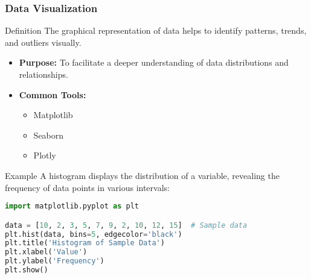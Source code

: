 \documentclass[aspectratio=169]{beamer}
\begin{document}
\begin{frame}[fragile]
  \frametitle{Data Visualization}
  \begin{block}{Definition}
    The graphical representation of data helps to identify patterns, trends, and outliers visually.
  \end{block}
  \begin{itemize}
    \item \textbf{Purpose:} To facilitate a deeper understanding of data distributions and relationships.
    \item \textbf{Common Tools:}
      \begin{itemize}
        \item Matplotlib
        \item Seaborn
        \item Plotly
      \end{itemize}
  \end{itemize}
  \begin{block}{Example}
    A histogram displays the distribution of a variable, revealing the frequency of data points in various intervals:
  \end{block}
  \begin{lstlisting}[language=Python]
import matplotlib.pyplot as plt

data = [10, 2, 3, 5, 7, 9, 2, 10, 12, 15]  # Sample data
plt.hist(data, bins=5, edgecolor='black')
plt.title('Histogram of Sample Data')
plt.xlabel('Value')
plt.ylabel('Frequency')
plt.show()
  \end{lstlisting}
\end{frame}
\end{document}

